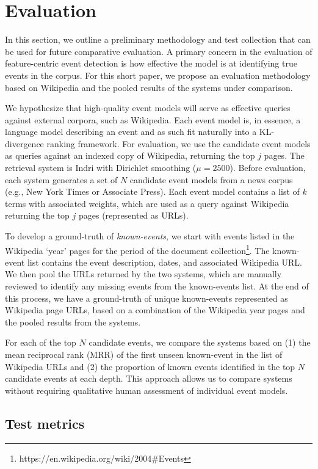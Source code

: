 \documentclass{sig-alternate}
\begin{document}
\section{Evaluation}

In this section, we outline a preliminary methodology and test collection that can be used for future comparative evaluation. A primary concern in the evaluation of feature-centric event detection is how effective the model is at identifying true events in the corpus. For this short paper, we propose an evaluation methodology based on Wikipedia and the pooled results of the systems under comparison.

We hypothesize that high-quality event models will serve as effective queries against external corpora, such as Wikipedia. Each event model is, in essence, a language model describing an event and as such fit naturally into a KL-divergence ranking framework. For evaluation, we use the candidate event models as queries against an indexed copy of Wikipedia, returning the top $j$ pages. The retrieval system is Indri with Dirichlet smoothing ($\mu=2500$). 
Before evaluation, each system generates a set of $N$ candidate event models from a news corpus (e.g., New York Times or Associate Press). Each event model contains a list of $k$ terms with associated weights, which are used as a query against Wikipedia returning the top $j$ pages (represented as URLs).

To develop a ground-truth of \emph{known-events}, we start with events listed in the Wikipedia `year' pages for the period of the document collection\footnote{https://en.wikipedia.org/wiki/2004\#Events}. The known-event list contains the event description, dates, and associated Wikipedia URL. We then pool the URLs returned by the two systems, which are manually reviewed to identify any missing events from the known-events list.  At the end of this process, we have a ground-truth of unique known-events represented as Wikipedia page URLs, based on a combination of the Wikipedia year pages and the pooled results from the systems.  

For each of the top $N$ candidate events, we compare the systems based on (1) the mean reciprocal rank (MRR) of the first unseen known-event in the list of Wikipedia URLs and (2) the proportion of known events identified in the top $N$ candidate events at each depth.  This approach allows us to compare systems without requiring qualitative human assessment of individual event models.

\subsection{Test metrics}
\end{document}
